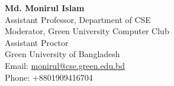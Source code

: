 \documentclass[localFont,alternative,monochrome]{documentMETADATA}
\begin{document}
	\medskip
	\textbf{Md. Monirul Islam}\\
	Assistant Professor, Department of CSE\\
	Moderator, Green University Computer Club\\
	Assistant Proctor\\
	Green University of Bangladesh\\
	Email: \href{mailto:monirul@cse.green.edu.bd}{monirul@cse.green.edu.bd}\\
	Phone: +8801909416704
\end{document}
